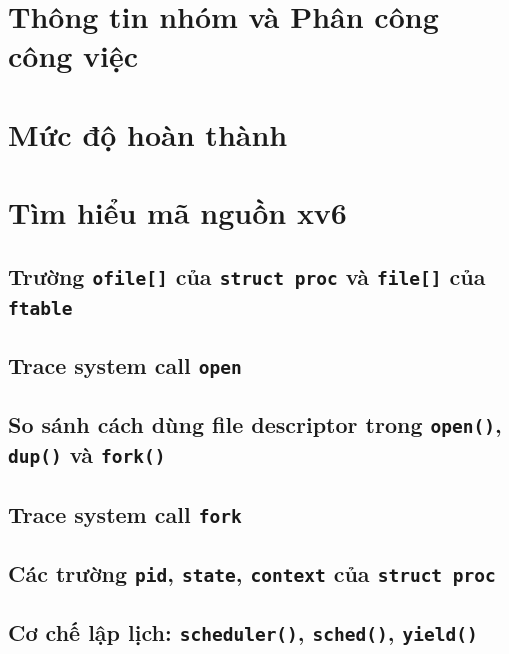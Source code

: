 
\section{Thông tin nhóm và Phân công công việc}

\section{Mức độ hoàn thành}

\section{Tìm hiểu mã nguồn xv6}

\subsection{Trường \texttt{ofile[]} của \texttt{struct proc} và \texttt{file[]} của \texttt{ftable}}

\subsection{Trace system call \texttt{open}}

\subsection{So sánh cách dùng file descriptor trong \texttt{open()}, \texttt{dup()} và \texttt{fork()}}

\subsection{Trace system call \texttt{fork}}

\subsection{Các trường \texttt{pid}, \texttt{state}, \texttt{context} của \texttt{struct proc}}

\subsection{Cơ chế lập lịch: \texttt{scheduler()}, \texttt{sched()}, \texttt{yield()}}

